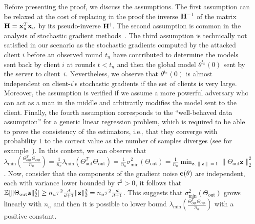 Before presenting the proof, we discuss the assumptions. The first assumption can be relaxed at the cost of replacing in the proof the inverse $\mathbf{H}^{-1}$ of the matrix $\mathbf{H} = {\mathbf{x}}_u^{T} {\mathbf{x}}_u$ by its pseudo-inverse $\mathbf{H}^\dagger$. The second assumption is common in the analysis of stochastic gradient methods~\cite{agarwal2012stochastic,pmlr-v70-jin17a,vlaski2021,li2020high,zhou2020convergence}. The third assumption is technically not satisfied in our scenario as the stochastic gradients computed by the attacked client $i$ before an observed round $t_n$ have contributed to determine the models sent back by client $i$ at rounds $t < t_n$ and then the global model $\theta^{t_n}(0)$ sent by the server to client~$i$. Nevertheless, we observe that $\theta^{t_n}(0)$ is almost independent on client-$i$'s  stochastic gradients if the set of clients is very large. Moreover, the assumption is verified if we assume a more powerful adversary who can act as a man in the middle and arbitrarily modifies the model sent to the client. Finally, the fourth assumption corresponds to the ``well-behaved data assumption'' for a generic linear regression problem, which is required to be able to prove the consistency of the estimators, i.e., that they converge with probability $1$ to the correct value as the number of samples diverges (see for example~\cite[Thm.~3.11]{shao2003mathematical}). 
In this context, we can observe that $\lambda_{\min}\!\left(\frac{\Theta_{\text{out}}^{T} \Theta_{\text{out}}}{n_u}\right)=\frac{1}{n_u}\lambda_{\min}\!\left(\Theta_{\text{out}}^{T} \Theta_{\text{out}}\right)=\frac{1}{n_u}\sigma_{\min}^2\!\left(\Theta_{\text{out}}\right)=\frac{1}{n_u}\min_{\mathbf{z}, \lVert \mathbf z\rVert= 1} \lVert \Theta_{\text{out}} \mathbf z\rVert_2^2$. Now, consider that the components of the gradient noise $\mathbf{e}(\theta)$ are independent, each with variance lower bounded by $\tau^2>0$, it follows that $\mathbb{E}[\lVert \Theta_{\text{out}} \mathbf z\rVert_2^2]\ge n_u \tau^2 \frac{d}{d+1} \lVert\mathbf z \rVert_2^2 =n_u \tau^2 \frac{d}{d+1}$. This suggests that $\sigma_{\min}^2\!\left(\Theta_{\text{out}}\right)$  grows linearly with $n_u$ and then it is possible to lower bound $\lambda_{\min}\!\left(\frac{\Theta_{\text{out}}^{T} \Theta_{\text{out}}}{n_u}\right)$ with a positive constant. 

